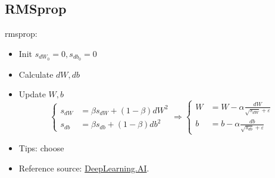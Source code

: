 \subsection{RMSprop}
\ac{rmsprop}:
\begin{itemize}
	\item Init $s_{dW_0} = 0, s_{db_0}=0$
	\item Calculate $dW, db$
	\item Update $W, b$
	\begin{equation}
		\begin{cases}
			s_{dW} &= \beta s_{dW} + (1-\beta)dW^2 \\
			s_{db} &= \beta s_{db} + (1-\beta)db^2
		\end{cases}
		\Rightarrow
		\begin{cases}
			W &= W - \alpha \frac{dW}{\sqrt{s_{dW}} + \varepsilon}\\
			b &= b - \alpha \frac{db}{\sqrt{s_{db}} + \varepsilon}
		\end{cases}
	\end{equation}
	\item Tips: choose 
	\item Reference source: \href{https://youtu.be/_e-LFe_igno}{DeepLearning.AI}.
\end{itemize}

